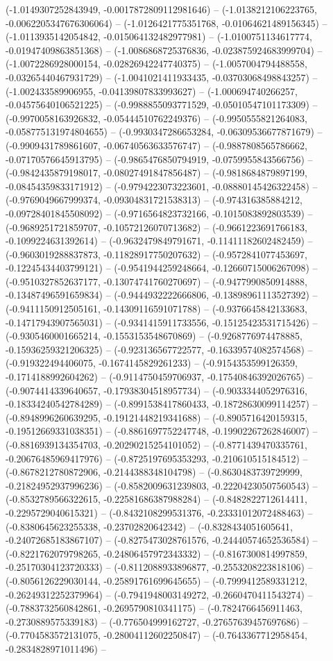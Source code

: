 (-1.0149307252843949, -0.0017872809112981646) -- (-1.0138212106223765, -0.0062205347676306064) -- (-1.0126421775351768, -0.01064621489156345) -- (-1.0113935142054842, -0.015064132482977981) -- (-1.0100751134617774, -0.01947409863851368) -- (-1.0086868725376836, -0.023875924683999704) -- (-1.0072286928000154, -0.02826942247740375) -- (-1.0057004794488558, -0.03265440467931729) -- (-1.0041021411933435, -0.03703068498843257) -- (-1.002433589906955, -0.04139807833993627) -- (-1.000694740266257, -0.04575640106521225) -- (-0.9988855093771529, -0.05010547101173309) -- (-0.9970058163926832, -0.05444510762249376) -- (-0.9950555821264083, -0.058775131974804655) -- (-0.9930347286653284, -0.06309536677871679) -- (-0.9909431789861607, -0.06740563633576747) -- (-0.9887808565786662, -0.07170576645913795) -- (-0.9865476850794919, -0.0759955843566756) -- (-0.9842435879198017, -0.08027491847856487) -- (-0.9818684879897199, -0.08454359833171912) -- (-0.9794223073223601, -0.08880145426322458) -- (-0.9769049667999374, -0.09304831721538313) -- (-0.974316385884212, -0.09728401845508092) -- (-0.9716564823732166, -0.1015083892803539) -- (-0.9689251721859707, -0.10572126070713682) -- (-0.9661223691766183, -0.1099224631392614) -- (-0.9632479849791671, -0.11411182602482459) -- (-0.9603019288837873, -0.11828917750207632) -- (-0.9572841077453697, -0.12245434403799121) -- (-0.9541944259248664, -0.12660715006267098) -- (-0.9510327852637177, -0.13074741760270697) -- (-0.9477990850914888, -0.13487496591659834) -- (-0.9444932222666806, -0.13898961113527392) -- (-0.9411150912505161, -0.14309116591071788) -- (-0.9376645842133683, -0.14717943907565031) -- (-0.9341415911733556, -0.15125423531715426) -- (-0.9305460001665214, -0.1553153548670869) -- (-0.9268776974478885, -0.15936259321206325) -- (-0.923136567722577, -0.16339574082574568) -- (-0.919322494406075, -0.1674145829261233) -- (-0.9154353599126359, -0.1714188992604262) -- (-0.9114750459706937, -0.17540846392026765) -- (-0.9074414339640657, -0.17938304518957734) -- (-0.9033344052976316, -0.18334240542784289) -- (-0.8991538417860433, -0.18728630099114257) -- (-0.8948996260639295, -0.19121448219341688) -- (-0.8905716420159315, -0.19512669331038351) -- (-0.8861697752247748, -0.19902267262846007) -- (-0.8816939134354703, -0.20290215254101052) -- (-0.8771439470335761, -0.20676485969417976) -- (-0.8725197695353293, -0.210610515184512) -- (-0.8678212780872906, -0.2144388348104798) -- (-0.8630483739729999, -0.21824952937996236) -- (-0.8582009631239803, -0.22204230507560543) -- (-0.8532789566322615, -0.22581686387988284) -- (-0.8482822712614411, -0.2295729040615321) -- (-0.8432108299531376, -0.23331012072488463) -- (-0.8380645623255338, -0.23702820642342) -- (-0.8328434051605641, -0.24072685183867107) -- (-0.8275473028761576, -0.24440574652536584) -- (-0.8221762079798265, -0.24806457972343332) -- (-0.8167300814997859, -0.25170304123720333) -- (-0.8112088933896877, -0.2553208223818106) -- (-0.8056126229030144, -0.25891761699645655) -- (-0.7999412589331212, -0.26249312252379964) -- (-0.7941948003149272, -0.2660470411543274) -- (-0.7883732560842861, -0.2695790810341175) -- (-0.7824766456911463, -0.2730889575339183) -- (-0.776504999162727, -0.27657639457697686) -- (-0.7704583572131075, -0.28004112602250847) -- (-0.7643367712958454, -0.2834828971011496) -- 